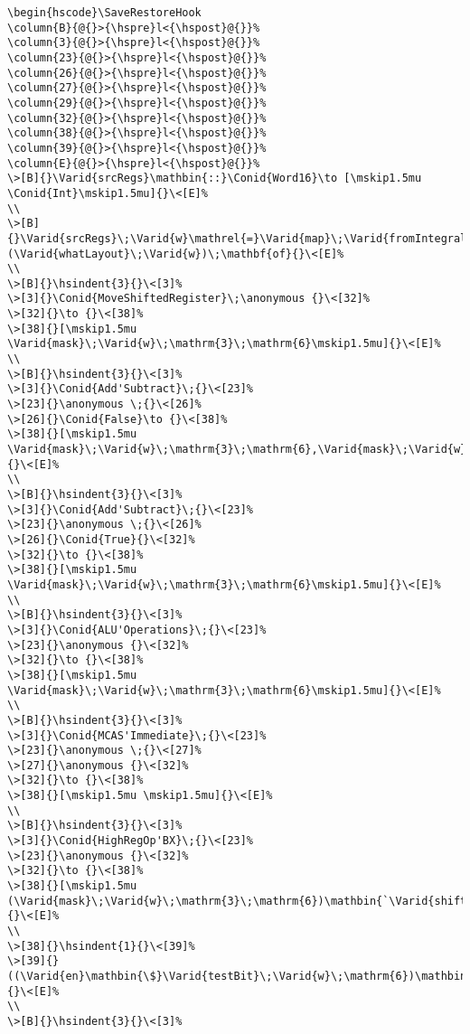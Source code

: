 \documentclass{article}
\makeatletter
\newcommand{\Conid}[1]{\mathit{#1}}
\newcommand{\Varid}[1]{\mathit{#1}}
\newcommand{\anonymous}{\kern0.06em \vbox{\hrule\@width.5em}}
\newcommand{\hsindent}[1]{\quad}%
\let\hspre\empty
\let\hspost\empty
\makeatother
\begin{document}
\begin{Verbatim}[fontsize=\scriptsize]
\begin{hscode}\SaveRestoreHook
\column{B}{@{}>{\hspre}l<{\hspost}@{}}%
\column{3}{@{}>{\hspre}l<{\hspost}@{}}%
\column{23}{@{}>{\hspre}l<{\hspost}@{}}%
\column{26}{@{}>{\hspre}l<{\hspost}@{}}%
\column{27}{@{}>{\hspre}l<{\hspost}@{}}%
\column{29}{@{}>{\hspre}l<{\hspost}@{}}%
\column{32}{@{}>{\hspre}l<{\hspost}@{}}%
\column{38}{@{}>{\hspre}l<{\hspost}@{}}%
\column{39}{@{}>{\hspre}l<{\hspost}@{}}%
\column{E}{@{}>{\hspre}l<{\hspost}@{}}%
\>[B]{}\Varid{srcRegs}\mathbin{::}\Conid{Word16}\to [\mskip1.5mu \Conid{Int}\mskip1.5mu]{}\<[E]%
\\
\>[B]{}\Varid{srcRegs}\;\Varid{w}\mathrel{=}\Varid{map}\;\Varid{fromIntegral}\mathbin{\$}\mathbf{case}\;(\Varid{whatLayout}\;\Varid{w})\;\mathbf{of}{}\<[E]%
\\
\>[B]{}\hsindent{3}{}\<[3]%
\>[3]{}\Conid{MoveShiftedRegister}\;\anonymous {}\<[32]%
\>[32]{}\to {}\<[38]%
\>[38]{}[\mskip1.5mu \Varid{mask}\;\Varid{w}\;\mathrm{3}\;\mathrm{6}\mskip1.5mu]{}\<[E]%
\\
\>[B]{}\hsindent{3}{}\<[3]%
\>[3]{}\Conid{Add'Subtract}\;{}\<[23]%
\>[23]{}\anonymous \;{}\<[26]%
\>[26]{}\Conid{False}\to {}\<[38]%
\>[38]{}[\mskip1.5mu \Varid{mask}\;\Varid{w}\;\mathrm{3}\;\mathrm{6},\Varid{mask}\;\Varid{w}\;\mathrm{6}\;\mathrm{9}\mskip1.5mu]{}\<[E]%
\\
\>[B]{}\hsindent{3}{}\<[3]%
\>[3]{}\Conid{Add'Subtract}\;{}\<[23]%
\>[23]{}\anonymous \;{}\<[26]%
\>[26]{}\Conid{True}{}\<[32]%
\>[32]{}\to {}\<[38]%
\>[38]{}[\mskip1.5mu \Varid{mask}\;\Varid{w}\;\mathrm{3}\;\mathrm{6}\mskip1.5mu]{}\<[E]%
\\
\>[B]{}\hsindent{3}{}\<[3]%
\>[3]{}\Conid{ALU'Operations}\;{}\<[23]%
\>[23]{}\anonymous {}\<[32]%
\>[32]{}\to {}\<[38]%
\>[38]{}[\mskip1.5mu \Varid{mask}\;\Varid{w}\;\mathrm{3}\;\mathrm{6}\mskip1.5mu]{}\<[E]%
\\
\>[B]{}\hsindent{3}{}\<[3]%
\>[3]{}\Conid{MCAS'Immediate}\;{}\<[23]%
\>[23]{}\anonymous \;{}\<[27]%
\>[27]{}\anonymous {}\<[32]%
\>[32]{}\to {}\<[38]%
\>[38]{}[\mskip1.5mu \mskip1.5mu]{}\<[E]%
\\
\>[B]{}\hsindent{3}{}\<[3]%
\>[3]{}\Conid{HighRegOp'BX}\;{}\<[23]%
\>[23]{}\anonymous {}\<[32]%
\>[32]{}\to {}\<[38]%
\>[38]{}[\mskip1.5mu (\Varid{mask}\;\Varid{w}\;\mathrm{3}\;\mathrm{6})\mathbin{`\Varid{shiftL}`}{}\<[E]%
\\
\>[38]{}\hsindent{1}{}\<[39]%
\>[39]{}((\Varid{en}\mathbin{\$}\Varid{testBit}\;\Varid{w}\;\mathrm{6})\mathbin{*}\mathrm{3})\mskip1.5mu]{}\<[E]%
\\
\>[B]{}\hsindent{3}{}\<[3]%

\end{Verbatim}
\end{document}
